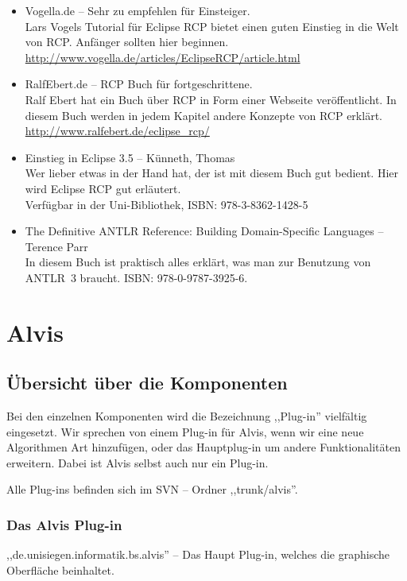 \documentclass[10pt,a4paper,oneside]{scrbook}
\begin{document}
\begin{itemize}
\item Vogella.de -- Sehr zu empfehlen für Einsteiger. \\
Lars Vogels Tutorial für Eclipse RCP bietet einen guten Einstieg in die Welt von RCP. Anfänger sollten hier beginnen.\\
\url{http://www.vogella.de/articles/EclipseRCP/article.html}
\item RalfEbert.de -- RCP Buch für fortgeschrittene. \\
Ralf Ebert hat ein Buch über RCP in Form einer Webseite veröffentlicht. In diesem Buch werden in jedem Kapitel andere Konzepte von RCP erklärt. \\
\url{http://www.ralfebert.de/eclipse\_rcp/}
\item Einstieg in Eclipse 3.5 -- Künneth, Thomas \\
Wer lieber etwas in der Hand hat, der ist mit diesem Buch gut bedient. Hier wird Eclipse RCP gut erläutert. \\
Verfügbar in der Uni-Bibliothek, ISBN: 978-3-8362-1428-5
\item The Definitive ANTLR Reference: Building Domain-Specific Languages -- Terence Parr \\
In diesem Buch ist praktisch alles erklärt, was man zur Benutzung von ANTLR~3 braucht.
ISBN: 978-0-9787-3925-6.
\end{itemize}


\newpage
\chapter{Alvis}
\section{Übersicht über die Komponenten}
Bei den einzelnen Komponenten wird die Bezeichnung ,,Plug-in'' vielfältig eingesetzt. Wir sprechen von einem Plug-in für Alvis, wenn wir eine neue Algorithmen Art hinzufügen, oder das Hauptplug-in um andere Funktionalitäten erweitern. Dabei ist Alvis selbst auch nur ein Plug-in.

Alle Plug-ins befinden sich im SVN -- Ordner ,,trunk/alvis''.
\subsection{Das Alvis Plug-in}
,,de.unisiegen.informatik.bs.alvis'' -- Das Haupt Plug-in, welches die graphische Oberfläche beinhaltet.
\end{document}
